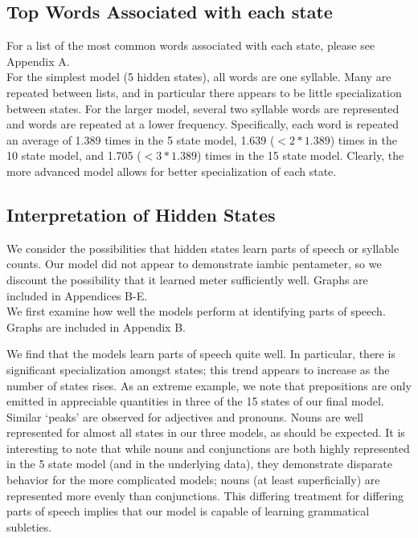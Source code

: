 \subsection{Top Words Associated with each state}
For a list of the most common words associated with each state, please see Appendix A.\\

For the simplest model (5 hidden states), all words are one syllable. Many are repeated between lists, and in particular there appears to be little specialization between states. For the larger model, several two syllable words are represented and words are repeated at a lower frequency. Specifically, each word is repeated an average of 1.389 times in the 5 state model, 1.639 ($< 2 * 1.389$) times in the 10 state model, and 1.705 ($< 3 * 1.389$) times in the 15 state model. Clearly, the more advanced model allows for better specialization of each state.

\subsection{Interpretation of Hidden States}
We consider the possibilities that hidden states learn parts of speech or syllable counts. Our model did not appear to demonstrate iambic pentameter, so we discount the possibility that it learned meter sufficiently well. Graphs are included in Appendices B-E.\\

We first examine how well the models perform at identifying parts of speech. Graphs are included in Appendix B.

We find that the models learn parts of speech quite well. In particular, there is significant specialization amongst states; this trend appears to increase as the number of states rises. As an extreme example, we note that prepositions are only emitted in appreciable quantities in three of the 15 states of our final model. Similar `peaks' are observed for adjectives and pronouns. Nouns are well represented for almost all states in our three models, as should be expected. It is interesting to note that while nouns and conjunctions are both highly represented in the 5 state model (and in the underlying data), they demonstrate disparate behavior for the more complicated models; nouns (at least superficially) are represented more evenly than conjunctions. This differing treatment for differing parts of speech implies that our model is capable of learning grammatical subleties.\\

